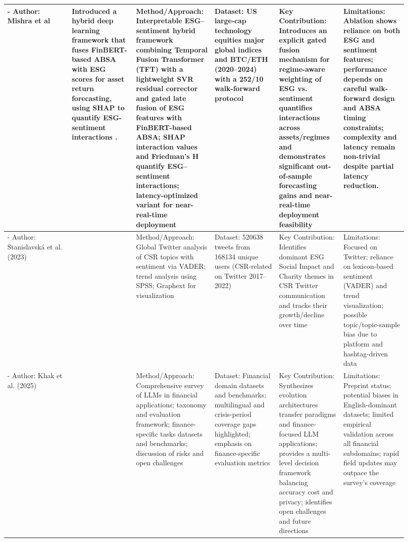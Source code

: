 \documentclass{article}
\begin{document}
\begin{landscape}
\begin{longtable}{p{0.157\linewidth} p{0.157\linewidth} p{0.157\linewidth} p{0.157\linewidth} p{0.157\linewidth} p{0.157\linewidth}}
- Author: Mishra et al & Introduced a hybrid deep learning framework that fuses \textbf{FinBERT-based ABSA} with ESG scores for asset return forecasting, using SHAP to quantify ESG-sentiment interactions  \parencite{s_k__mishra_193adeb9}. & Method/Approach: Interpretable ESG–sentiment hybrid framework combining Temporal Fusion Transformer (TFT) with a lightweight SVR residual corrector and gated late fusion of ESG features with FinBERT-based ABSA; SHAP interaction values and Friedman’s H quantify ESG–sentiment interactions; latency-optimized variant for near-real-time deployment & Dataset: US large-cap technology equities major global indices and BTC/ETH (2020–2024) with a 252/10 walk-forward protocol & Key Contribution: Introduces an explicit gated fusion mechanism for regime-aware weighting of ESG vs. sentiment quantifies interactions across assets/regimes and demonstrates significant out-of-sample forecasting gains and near-real-time deployment feasibility & Limitations: Ablation shows reliance on both ESG and sentiment features; performance depends on careful walk-forward design and ABSA timing constraints; complexity and latency remain non-trivial despite partial latency reduction. \\ \hline
- Author: Stanislavská et al. (2023) & ~ & Method/Approach: Global Twitter analysis of CSR topics with sentiment via VADER; trend analysis using SPSS; Graphext for visualization & Dataset: 520638 tweets from 168134 unique users (CSR-related on Twitter 2017–2022) & Key Contribution: Identifies dominant ESG Social Impact and Charity themes in CSR Twitter communication and tracks their growth/decline over time & Limitations: Focused on Twitter; reliance on lexicon-based sentiment (VADER) and trend visualization; possible topic/topic-sample bias due to platform and hashtag-driven data \\ \hline
- Author: Khak et al. (2025) & ~ & Method/Approach: Comprehensive survey of LLMs in financial applications; taxonomy and evaluation framework; finance-specific tasks datasets and benchmarks; discussion of risks and open challenges & Dataset: Financial domain datasets and benchmarks; multilingual and crisis-period coverage gaps highlighted; emphasis on finance-specific evaluation metrics & Key Contribution: Synthesizes evolution architectures transfer paradigms and finance-focused LLM applications; provides a multi-level decision framework balancing accuracy cost and privacy; identifies open challenges and future directions & Limitations: Preprint status; potential biases in English-dominant datasets; limited empirical validation across all financial subdomains; rapid field updates may outpace the survey's coverage \\ \hline

\end{longtable}
\end{landscape}
\end{document}
